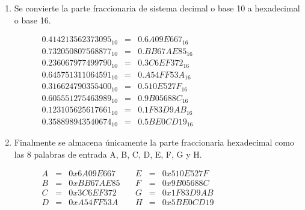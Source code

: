\documentclass{article}
\begin{document}
\begin{enumerate}
            \item Se convierte la parte fraccionaria de sistema decimal o base 10 a hexadecimal o base 16.
                \begin{figure}[H]
                \centering
                    $\begin{array}{lcl}
                        0.414213562373095_{10} & = & 0.6A09E667_{16} \\
                        0.732050807568877_{10} & = & 0.BB67AE85_{16} \\
                        0.236067977499790_{10} & = & 0.3C6EF372_{16} \\
                        0.645751311064591_{10} & = & 0.A54FF53A_{16} \\
                        0.316624790355400_{10} & = & 0.510E527F_{16} \\
                        0.605551275463989_{10} & = & 0.9B05688C_{16} \\
                        0.123105625617661_{10} & = & 0.1F83D9AB_{16} \\
                        0.358898943540674_{10} & = & 0.5BE0CD19_{16}
                    \end{array}$
                \end{figure}
            
            \item Finalmente se almacena únicamente la parte fraccionaria hexadecimal como las 8 palabras de entrada A, B, C, D, E, F, G y H.
                \begin{figure}[H]
                \centering
                    $\begin{array}{rclcrcl}
                        A & = & 0x6A09E667 & \ & E & = & 0x510E527F \\
                        B & = & 0xBB67AE85 & \ & F & = & 0x9B05688C \\
                        C & = & 0x3C6EF372 & \ & G & = & 0x1F83D9AB \\
                        D & = & 0xA54FF53A & \ & H & = & 0x5BE0CD19
                    \end{array}$
                \end{figure}
        \end{enumerate}
\end{document}
